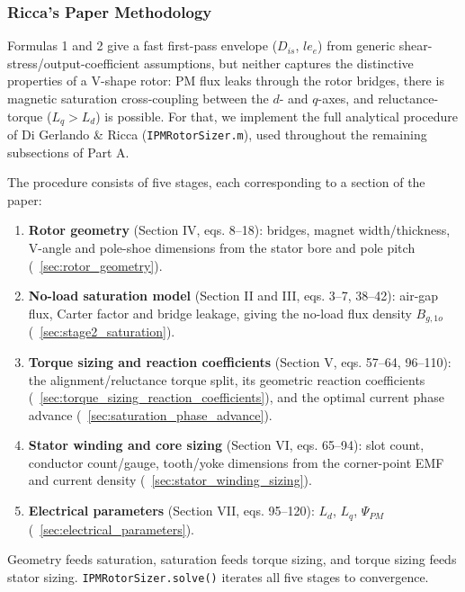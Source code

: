 \documentclass[10pt,final,journal,a4paper,oneside,twocolumn]{IEEEtran}
\begin{document}
\subsubsection{Ricca's Paper Methodology}
\label{sec:ricca_methodology}
Formulas 1 and 2 give a fast first-pass envelope ($D_{is}$, $le_e$) from generic shear-stress/output-coefficient assumptions, but neither captures the distinctive properties of a V-shape rotor: PM flux leaks through the rotor bridges, there is magnetic saturation cross-coupling between the $d$- and $q$-axes, and reluctance-torque ($L_q>L_d$) is possible. For that, we implement the full analytical procedure of Di Gerlando \& Ricca \cite{DiGerlandoRicca2022} (\texttt{IPMRotorSizer.m}), used throughout the remaining subsections of Part A.

The procedure consists of five stages, each corresponding to a section of the paper:
\begin{enumerate}
    \item \textbf{Rotor geometry} (Section IV, eqs. 8--18): bridges, magnet width/thickness, V-angle and pole-shoe dimensions from the stator bore and pole pitch (\sectionname~\ref{sec:rotor_geometry}).
    \item \textbf{No-load saturation model} (Section II and III, eqs. 3--7, 38--42): air-gap flux, Carter factor and bridge leakage, giving the no-load flux density $B_{g,1o}$ (\sectionname~\ref{sec:stage2_saturation}).
    \item \textbf{Torque sizing and reaction coefficients} (Section V, eqs. 57--64, 96--110): the alignment/reluctance torque split, its geometric reaction coefficients (\sectionname~\ref{sec:torque_sizing_reaction_coefficients}), and the optimal current phase advance (\sectionname~\ref{sec:saturation_phase_advance}).
    \item \textbf{Stator winding and core sizing} (Section VI, eqs. 65--94): slot count, conductor count/gauge, tooth/yoke dimensions from the corner-point EMF and current density (\sectionname~\ref{sec:stator_winding_sizing}).
    \item \textbf{Electrical parameters} (Section VII, eqs. 95--120): $L_d$, $L_q$, $\Psi_{PM}$ (\sectionname~\ref{sec:electrical_parameters}).
\end{enumerate}
Geometry feeds saturation, saturation feeds torque sizing, and torque sizing feeds stator sizing. \texttt{IPMRotorSizer.solve()} iterates all five stages to convergence.
\end{document}
